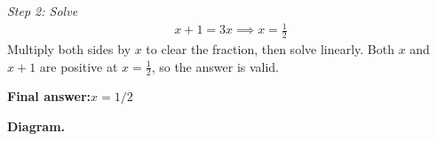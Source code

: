 \documentclass[11pt]{article}
\begin{document}
\textit{Step 2: Solve}
\[\begin{gathered}
x + 1 = 3x \implies x = \frac{1}{2}
\end{gathered}\]
Multiply both sides by \( x \) to clear the fraction, then solve linearly. Both \( x \) and \( x+1 \) are positive at \( x = \tfrac{1}{2} \), so the answer is valid.

\begin{answerbox}
\textbf{Final answer:}\quad \(\displaystyle x = 1/2\)
\end{answerbox}
\textbf{Diagram.}

\begin{center}
\end{center}
\end{document}

